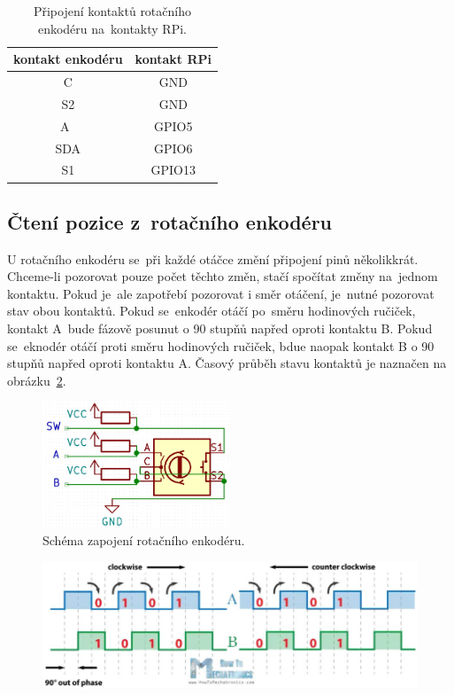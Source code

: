 \begin{table}[htb]
  \centering
  \begin{tabular}{c|c}
    kontakt enkodéru & kontakt RPi \\
    \hline
    C                & GND         \\
    S2               & GND         \\
    A~               & GPIO5       \\
    SDA              & GPIO6       \\
    S1               & GPIO13      \\
  \end{tabular}
  \caption{\label{tab:enc_conn} Připojení kontaktů rotačního enkodéru na~kontakty RPi.}
\end{table}


\subsection{Čtení pozice z~rotačního enkodéru}
U rotačního enkodéru se~při každé otáčce změní připojení pinů několikkrát. Chceme-li pozorovat pouze počet těchto změn, stačí spočítat změny na~jednom kontaktu. Pokud je~ale zapotřebí pozorovat i směr otáčení, je~nutné pozorovat stav obou kontaktů. Pokud se~enkodér otáčí po~směru hodinových ručiček, kontakt A~bude fázově posunut o 90 stupňů napřed oproti kontaktu B. Pokud se~eknodér otáčí proti směru hodinových ručiček, bdue naopak kontakt B o 90 stupňů napřed oproti kontaktu A. Časový průběh stavu kontaktů je naznačen na obrázku~\ref{fig:encoder_data}.
\begin{figure}[htb]
  \centering
  \includegraphics[width=0.5\textwidth]{img/encoder-pinout.jpg}
  \caption{\label{fig:encoder-pinout} Schéma zapojení rotačního enkodéru.}
\end{figure}
\begin{figure}[htb]
  \centering
  \includegraphics[width=1\textwidth]{img/encoder_data.jpg}
  \caption{\label{fig:encoder_data} }
\end{figure}
